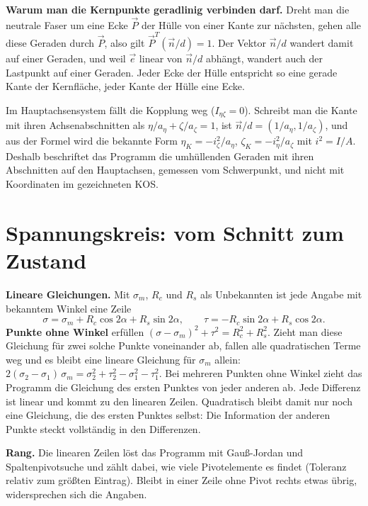 \textbf{Warum man die Kernpunkte geradlinig verbinden darf.} Dreht man die neutrale Faser um eine
Ecke $\vec P$ der Hülle von einer Kante zur nächsten, gehen alle diese Geraden durch $\vec P$, also
gilt $\vec P^T(\vec n/d) = 1$. Der Vektor $\vec n/d$ wandert damit auf einer Geraden, und weil
$\vec e$ linear von $\vec n/d$ abhängt, wandert auch der Lastpunkt auf einer Geraden. Jeder Ecke der
Hülle entspricht so eine gerade Kante der Kernfläche, jeder Kante der Hülle eine Ecke.

Im Hauptachsensystem fällt die Kopplung weg ($I_{\eta\zeta} = 0$). Schreibt man die Kante mit
ihren Achsenabschnitten als $\eta/a_\eta + \zeta/a_\zeta = 1$, ist $\vec n/d = (1/a_\eta,
1/a_\zeta)$, und aus der Formel wird die bekannte Form $\eta_K = -i_\zeta^2/a_\eta$,
$\zeta_K = -i_\eta^2/a_\zeta$ mit $i^2 = I/A$. Deshalb beschriftet das
Programm die umhüllenden Geraden mit ihren Abschnitten auf den Hauptachsen, gemessen vom
Schwerpunkt, und nicht mit Koordinaten im gezeichneten KOS.

\section{Spannungskreis: vom Schnitt zum Zustand}\label{sec:mathe-kreis}

\textbf{Lineare Gleichungen.} Mit $\sigma_m$, $R_c$ und $R_s$ als Unbekannten ist jede Angabe mit
bekanntem Winkel eine Zeile
\[
  \sigma = \sigma_m + R_c\cos 2\alpha + R_s\sin 2\alpha, \qquad
  \tau = -R_c\sin 2\alpha + R_s\cos 2\alpha .
\]
\textbf{Punkte ohne Winkel} erfüllen $(\sigma - \sigma_m)^2 + \tau^2 = R_c^2 + R_s^2$. Zieht man
diese Gleichung für zwei solche Punkte voneinander ab, fallen alle quadratischen Terme weg und es
bleibt eine lineare Gleichung für $\sigma_m$ allein:
$2(\sigma_2 - \sigma_1)\,\sigma_m = \sigma_2^2 + \tau_2^2 - \sigma_1^2 - \tau_1^2$. Bei mehreren
Punkten ohne Winkel zieht das Programm die Gleichung des ersten Punktes von jeder anderen ab. Jede
Differenz ist linear und kommt zu den linearen Zeilen. Quadratisch bleibt damit nur noch eine
Gleichung, die des ersten Punktes selbst: Die Information der anderen Punkte steckt vollständig in
den Differenzen.

\textbf{Rang.} Die linearen Zeilen löst das Programm mit Gauß-Jordan und Spaltenpivotsuche und
zählt dabei, wie viele Pivotelemente es findet (Toleranz relativ zum größten Eintrag). Bleibt in
einer Zeile ohne Pivot rechts etwas übrig, widersprechen sich die Angaben.

